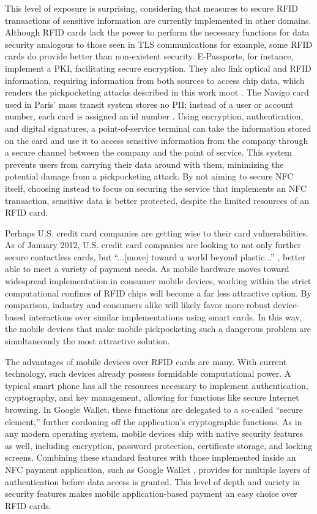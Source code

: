 \documentclass{sig-alternate}
\begin{document}
This level of exposure is surprising, considering that measures to secure RFID transactions of sensitive information are currently implemented in other domains.  Although RFID cards lack the power to perform the necessary functions for data security analogous to those seen in TLS communications for example, some RFID cards do provide better than non-existent security.  E-Passports, for instance, implement a PKI, facilitating secure encryption. They also link optical and RFID information, requiring information from both sources to access chip data, which renders the pickpocketing attacks described in this work moot \cite{security-privacy-epassports}.  The Navigo card used in Paris' mass transit system stores no PII; instead of a user or account number, each card is assigned an id number \cite{bt-hacking-nfc-ccs}.  Using encryption, authentication, and digital signatures, a point-of-service terminal can take the information stored on the card and use it to access sensitive information from the company through a secure channel between the company and the point of service.  This system prevents users from carrying their data around with them, minimizing the potential damage from a pickpocketing attack.  By not aiming to secure NFC itself, choosing instead to focus on securing the service that implements an NFC transaction, sensitive data is better protected, despite the limited resources of an RFID card.  

Perhaps U.S. credit card companies are getting wise to their card vulnerabilities.  As of January 2012, U.S. credit card companies are looking to not only further secure contactless cards, but ``...[move] toward a world beyond plastic...'' \cite{emv-upgrade}, better able to meet a variety of payment needs.  As mobile hardware moves toward widespread implementation in consumer mobile devices, working within the strict computational confines of RFID chips will become a far less attractive option. By comparison, industry and consumers alike will likely favor more robust device-based interactions over similar implementations using smart cards.  In this way, the mobile devices that make mobile pickpocketing such a dangerous problem are simultaneously the most attractive solution.     

The advantages of mobile devices over RFID cards are many.  With current technology, such devices already possess formidable computational power.  A typical smart phone has all the resources necessary to implement authentication, cryptography, and key management, allowing for functions like secure Internet browsing.  In Google Wallet, these functions are delegated to a so-called ``secure element,'' further cordoning off the application's cryptographic functions.  As in any modern operating system, mobile devices ship with native security features as well, including encryption, password protection, certificate storage, and locking screens.  Combining these standard features with those implemented inside an NFC payment application, such as Google Wallet \cite{google-wallet-security-1}, provides for multiple layers of authentication before data access is granted.  This level of depth and variety in security features makes mobile application-based payment an easy choice over RFID cards.  
\end{document}
